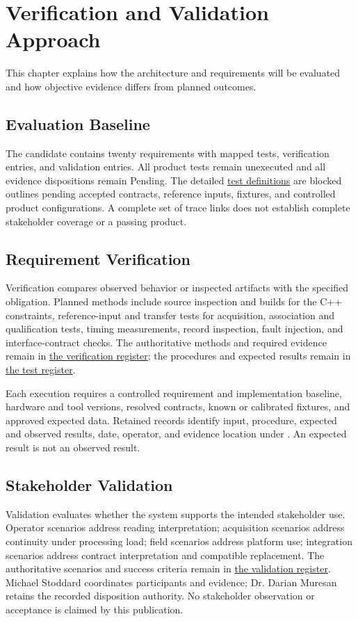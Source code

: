 \chapter{Verification and Validation Approach}
\label{Section:VerificationApproachResponsibility}
This chapter explains how the architecture and requirements will be evaluated and how
objective evidence differs from planned outcomes.


\section{Evaluation Baseline}
The candidate contains twenty requirements with mapped tests, verification
entries, and validation entries. All product tests remain unexecuted and
all evidence dispositions remain Pending. The detailed
\hyperref[Table:ProjectTests]{test definitions} are blocked outlines pending
accepted contracts, reference inputs, fixtures, and controlled product
configurations. A complete set of trace links does not establish complete
stakeholder coverage or a passing product.

\section{Requirement Verification}
Verification compares observed behavior or inspected artifacts with the
specified obligation. Planned methods include source inspection and builds
for the C++ constraints, reference-input and transfer tests for acquisition,
association and qualification tests, timing measurements, record inspection,
fault injection, and interface-contract checks. The authoritative methods
and required evidence remain in
\hyperref[Table:VerificationRegister]{the verification register}; the
procedures and expected results remain in
\hyperref[Table:ProjectTests]{the test register}.

Each execution requires a controlled requirement and implementation baseline,
hardware and tool versions, resolved contracts, known or calibrated fixtures,
and approved expected data. Retained records identify input, procedure,
expected and observed results, date, operator, and evidence location under
. An expected result is not an observed result.

\section{Stakeholder Validation}
Validation evaluates whether the system supports the intended stakeholder
use. Operator scenarios address reading interpretation; acquisition scenarios
address continuity under processing load; field scenarios address platform
use; integration scenarios address contract interpretation and compatible
replacement. The authoritative scenarios and success criteria remain in
\hyperref[Table:ValidationRegister]{the validation register}. Michael
Stoddard coordinates participants and evidence; Dr. Darian Muresan retains
the recorded disposition authority. No stakeholder observation or acceptance
is claimed by this publication.

